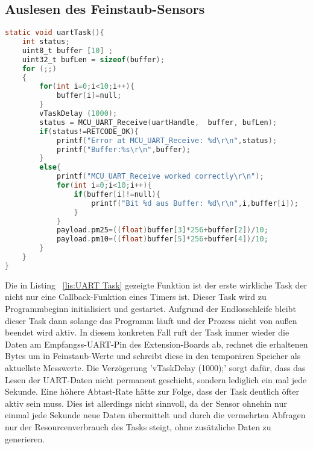 \subsection{Auslesen des Feinstaub-Sensors}\label{subsec:Auslesen des Feinstaub-Sensors}
\begin{lstlisting}[language=C, caption={\acs{UART} Task}, label=lis:UART Task]
static void uartTask(){
	int status;
	uint8_t buffer [10] ;
	uint32_t bufLen = sizeof(buffer);
	for (;;)
	{
		for(int i=0;i<10;i++){
			buffer[i]=null;
		}
		vTaskDelay (1000);
		status = MCU_UART_Receive(uartHandle,  buffer, bufLen);
		if(status!=RETCODE_OK){
			printf("Error at MCU_UART_Receive: %d\r\n",status);
			printf("Buffer:%s\r\n",buffer);
		}
		else{
			printf("MCU_UART_Receive worked correctly\r\n");
			for(int i=0;i<10;i++){
				if(buffer[i]!=null){
					printf("Bit %d aus Buffer: %d\r\n",i,buffer[i]);
				}
			}
			payload.pm25=((float)buffer[3]*256+buffer[2])/10;
			payload.pm10=((float)buffer[5]*256+buffer[4])/10;
		}
	}
}
\end{lstlisting}
Die in Listing ~\ref{lis:UART Task} gezeigte Funktion ist der erste wirkliche Task der nicht nur eine Callback-Funktion eines Timers ist. Dieser Task wird zu Programmbeginn initialisiert und gestartet. Aufgrund der Endlosschleife bleibt dieser Task dann solange das Programm läuft und der Prozess nicht von außen beendet wird aktiv. In diesem konkreten Fall ruft der Task immer wieder die Daten am Empfangss-\acs{UART}-Pin des Extension-Boards ab, rechnet die erhaltenen Bytes um in Feinstaub-Werte und schreibt diese in den temporären Speicher als aktuellste Messwerte. \newline
Die Verzögerung 'vTaskDelay (1000);' sorgt dafür, dass das Lesen der UART-Daten nicht permanent geschieht, sondern lediglich ein mal jede Sekunde. Eine höhere Abtast-Rate hätte zur Folge, dass der Task deutlich öfter aktiv sein muss. Dies ist allerdings nicht sinnvoll, da der Sensor ohnehin nur einmal jede Sekunde neue Daten übermittelt und durch die vermehrten Abfragen nur der Resourcenverbrauch des Tasks steigt, ohne zusätzliche Daten zu generieren.

